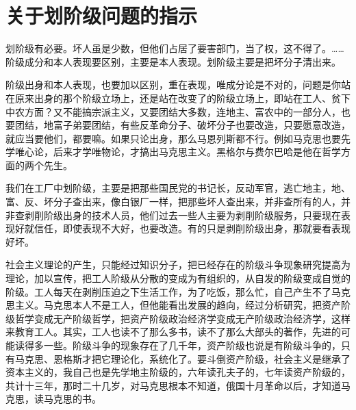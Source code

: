 \section[关于划阶级问题的指示（时间不详）]{关于划阶级问题的指示}


划阶级有必要。坏人虽是少数，但他们占居了要害部门，当了权，这不得了。……阶级成分和本人表现要区别，主要是本人表现。划阶级主要是把坏分子清出来。

阶级出身和本人表现，也要加以区别，重在表现，唯成分论是不对的，问题是你站在原来出身的那个阶级立场上，还是站在改变了的阶级立场上，即站在工人、贫下中农方面？又不能搞宗派主义，又要团结大多数，连地主、富农中的一部分人，也要团结，地富子弟要团结，有些反革命分子、破坏分子也要改造，只要愿意改造，就应当要他们，都要嘛。如果只论出身，那么马恩列斯都不行。例如马克思也要先学唯心论，后来才学唯物论，才搞出马克思主义。黑格尔与费尔巴哈是他在哲学方面的两个先生。

我们在工厂中划阶级，主要是把那些国民党的书记长，反动军官，逃亡地主，地、富、反、坏分子查出来，像白银厂一样，把那些坏人查出来，并非查所有的人，并非查剥削阶级出身的技术人员，他们过去一些人主要为剥削阶级服务，只要现在表现好就信任，即使表现不大好，也要改造。有的只是剥削阶级出身，那就要看表现好坏。

社会主义理论的产生，只能经过知识分子，把已经存在的阶级斗争现象研究提高为理论，加以宣传，把工人阶级从分散的变成为有组织的，从自发的阶级变成自觉的阶级。工人每天在剥削压迫之下生活工作，为了吃饭，那么忙，自己产生不了马克思主义。马克思本人不是工人，但他能看出发展的趋向，经过分析研究，把资产阶级哲学变成无产阶级哲学，把资产阶级政治经济学变成无产阶级政治经济学，这样来教育工人。其实，工人也读不了那么多书，读不了那么大部头的著作，先进的可能读得多一些。阶级斗争的现象存在了几千年，资产阶级也说是有阶级斗争的，只有马克思、恩格斯才把它理论化，系统化了。要斗倒资产阶级，社会主义是继承了资本主义的，我自己也是先学地主阶级的，六年读孔夫子的，七年读资产阶级的，共计十三年，那时二十几岁，对马克思根本不知道，俄国十月革命以后，才知道马克思，读马克思的书。


